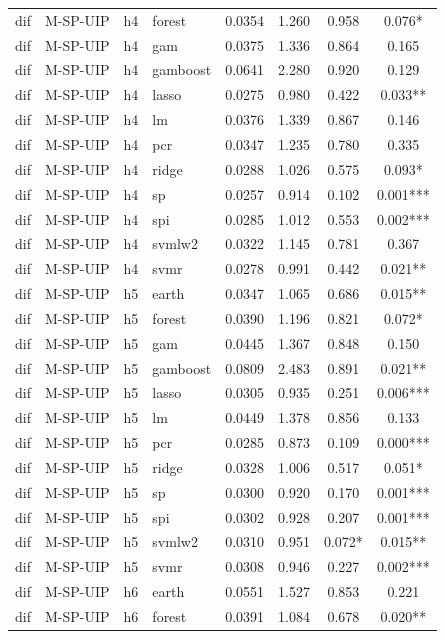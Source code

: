 \begin{ThreePartTable}
\begin{longtable}[t]{llclcccc}
dif & M-SP-UIP & h4 & forest & 0.0354 & 1.260 & 0.958 & 0.076*\\
dif & M-SP-UIP & h4 & gam & 0.0375 & 1.336 & 0.864 & 0.165\\
dif & M-SP-UIP & h4 & gamboost & 0.0641 & 2.280 & 0.920 & 0.129\\
dif & M-SP-UIP & h4 & lasso & 0.0275 & 0.980 & 0.422 & 0.033**\\
dif & M-SP-UIP & h4 & lm & 0.0376 & 1.339 & 0.867 & 0.146\\
dif & M-SP-UIP & h4 & pcr & 0.0347 & 1.235 & 0.780 & 0.335\\
dif & M-SP-UIP & h4 & ridge & 0.0288 & 1.026 & 0.575 & 0.093*\\
dif & M-SP-UIP & h4 & sp & 0.0257 & 0.914 & 0.102 & 0.001***\\
dif & M-SP-UIP & h4 & spi & 0.0285 & 1.012 & 0.553 & 0.002***\\
dif & M-SP-UIP & h4 & svmlw2 & 0.0322 & 1.145 & 0.781 & 0.367\\
dif & M-SP-UIP & h4 & svmr & 0.0278 & 0.991 & 0.442 & 0.021**\\
\addlinespace
dif & M-SP-UIP & h5 & earth & 0.0347 & 1.065 & 0.686 & 0.015**\\
dif & M-SP-UIP & h5 & forest & 0.0390 & 1.196 & 0.821 & 0.072*\\
dif & M-SP-UIP & h5 & gam & 0.0445 & 1.367 & 0.848 & 0.150\\
dif & M-SP-UIP & h5 & gamboost & 0.0809 & 2.483 & 0.891 & 0.021**\\
dif & M-SP-UIP & h5 & lasso & 0.0305 & 0.935 & 0.251 & 0.006***\\
dif & M-SP-UIP & h5 & lm & 0.0449 & 1.378 & 0.856 & 0.133\\
dif & M-SP-UIP & h5 & pcr & 0.0285 & 0.873 & 0.109 & 0.000***\\
dif & M-SP-UIP & h5 & ridge & 0.0328 & 1.006 & 0.517 & 0.051*\\
dif & M-SP-UIP & h5 & sp & 0.0300 & 0.920 & 0.170 & 0.001***\\
dif & M-SP-UIP & h5 & spi & 0.0302 & 0.928 & 0.207 & 0.001***\\
dif & M-SP-UIP & h5 & svmlw2 & 0.0310 & 0.951 & 0.072* & 0.015**\\
dif & M-SP-UIP & h5 & svmr & 0.0308 & 0.946 & 0.227 & 0.002***\\
\addlinespace
dif & M-SP-UIP & h6 & earth & 0.0551 & 1.527 & 0.853 & 0.221\\
dif & M-SP-UIP & h6 & forest & 0.0391 & 1.084 & 0.678 & 0.020**\\

\end{longtable}
\end{ThreePartTable}
